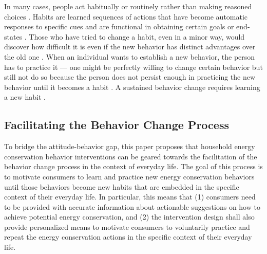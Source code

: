 \documentclass[a4paper]{article}
\begin{document}
In many cases, people act habitually or routinely rather than making reasoned choices \citep{Steg2009,Berthou2013}. Habits are learned sequences of actions that have become automatic responses to specific cues and are functional in obtaining certain goals or end-states \citep{Verplanken1999}. Those who have tried to change a habit, even in a minor way, would discover how difficult it is even if the new behavior has distinct advantages over the old one \citep{Kollmuss2002}. When an individual wants to establish a new behavior, the person has to practice it --- one might be perfectly willing to change certain behavior but still not do so because the person does not persist enough in practicing the new behavior until it becomes a habit \citep{Kollmuss2002}. A sustained behavior change requires learning a new habit \citep{Dillahunt:2009:GEU:1620545.1620583}. 


\subsection{Facilitating the Behavior Change Process}
\label{sec:bridgingGap:facilitatingProcess}

To bridge the attitude-behavior gap, this paper proposes that household energy conservation behavior interventions can be geared towards the facilitation of the behavior change process in the context of everyday life. The goal of this process is to motivate consumers to learn and practice new energy conservation behaviors until those behaviors become new habits that are embedded in the specific context of their everyday life. In particular, this means that (1) consumers need to be provided with accurate information about actionable suggestions on how to achieve potential energy conservation, and (2) the intervention design shall also provide personalized means to motivate consumers to voluntarily practice and repeat the energy conservation actions in the specific context of their everyday life.
\end{document}
